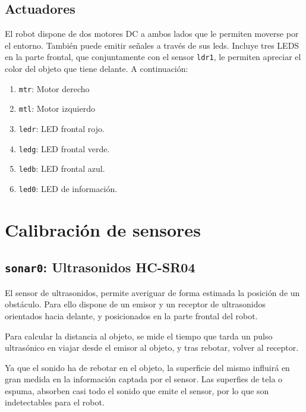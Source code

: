 \documentclass[10pt,a4paper,hidelinks,twocolumn,nobalancelastpage]{article}
\begin{document}
\subsection{Actuadores}
El robot dispone de dos motores DC a ambos lados que le permiten moverse por el 
entorno. También puede emitir señales a través de sus leds. Incluye tres LEDS en 
la parte frontal, que conjuntamente con el sensor \texttt{ldr1}, le permiten 
apreciar el color del objeto que tiene delante. A continuación:
\begin{enumerate}
	\setlength{\parskip}{0cm}

	\item \texttt{mtr}: Motor derecho
	\item \texttt{mtl}: Motor izquierdo
	\item \texttt{ledr}: LED frontal rojo.
	\item \texttt{ledg}: LED frontal verde.
	\item \texttt{ledb}: LED frontal azul.
	\item \texttt{led0}: LED de información.
\end{enumerate}


\section{Calibración de sensores}
\subsection{\texttt{sonar0}: Ultrasonidos HC-SR04}

El sensor de ultrasonidos, permite averiguar de forma estimada la posición de un 
obstáculo. Para ello dispone de un emisor y un receptor de ultrasonidos 
orientados hacia delante, y posicionados en la parte frontal del robot.

Para calcular la distancia al objeto, se mide el tiempo que tarda un pulso 
ultrasónico en viajar desde el emisor al objeto, y tras rebotar, volver al 
receptor.

Ya que el sonido ha de rebotar en el objeto, la superficie del mismo influirá en 
gran medida en la información captada por el sensor. Las superfies de tela o 
espuma, absorben casi todo el sonido que emite el sensor, por lo que son 
indetectables para el robot.
\end{document}
